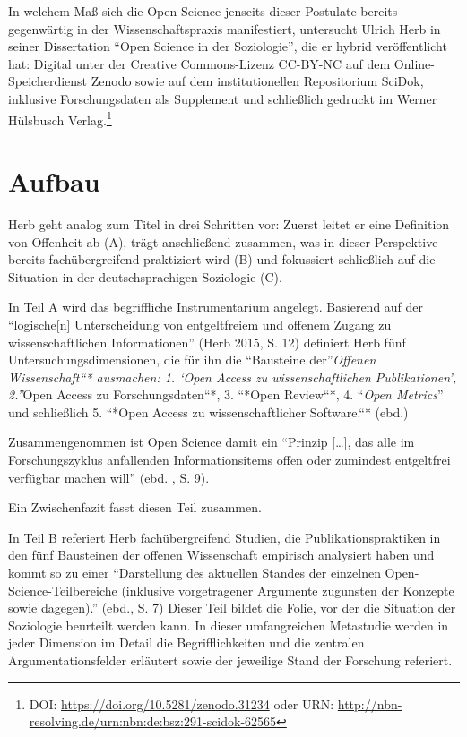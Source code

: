 \documentclass[a4paper,
fontsize=11pt,
oneside,
numbers=noperiodatend,
parskip=half-,
bibliography=totoc,
final
]{scrartcl}
\begin{document}
In welchem Maß sich die Open Science jenseits dieser Postulate bereits
gegenwärtig in der Wissenschaftspraxis manifestiert, untersucht Ulrich
Herb in seiner Dissertation \enquote{Open Science in der Soziologie},
die er hybrid veröffentlicht hat: Digital unter der Creative
Commons-Lizenz CC-BY-NC auf dem Online-Speicherdienst Zenodo sowie auf
dem institutionellen Repositorium SciDok, inklusive Forschungsdaten als
Supplement und schließlich gedruckt im Werner Hülsbusch
Verlag.\footnote{DOI: \url{https://doi.org/10.5281/zenodo.31234} oder
  URN: \url{http://nbn-resolving.de/urn:nbn:de:bsz:291-scidok-62565}}

\section*{Aufbau}\label{aufbau}

Herb geht analog zum Titel in drei Schritten vor: Zuerst leitet er eine
Definition von Offenheit ab (A), trägt anschließend zusammen, was in
dieser Perspektive bereits fachübergreifend praktiziert wird (B) und
fokussiert schließlich auf die Situation in der deutschsprachigen
Soziologie (C).

In Teil A wird das begriffliche Instrumentarium angelegt. Basierend auf
der \enquote{logische{[}n{]} Unterscheidung von entgeltfreiem und
offenem Zugang zu wissenschaftlichen Informationen} (Herb 2015, S. 12)
definiert Herb fünf Untersuchungsdimensionen, die für ihn die
\enquote{Bausteine der}\emph{Offenen Wissenschaft\enquote{* ausmachen:
1. \emph{\enquote{Open Access zu wissenschaftlichen Publikationen},}
2.}}Open Access zu Forschungsdaten``*, 3. ``*Open Review``*, 4.
\enquote{\emph{Open Metrics}} und schließlich 5. ``*Open Access zu
wissenschaftlicher Software.``* (ebd.)

Zusammengenommen ist Open Science damit ein \enquote{Prinzip
{[}\ldots{}{]}, das alle im Forschungszyklus anfallenden
Informationsitems offen oder zumindest entgeltfrei verfügbar machen
will} (ebd. , S. 9).

Ein Zwischenfazit fasst diesen Teil zusammen.

In Teil B referiert Herb fachübergreifend Studien, die
Publikationspraktiken in den fünf Bausteinen der offenen Wissenschaft
empirisch analysiert haben und kommt so zu einer \enquote{Darstellung
des aktuellen Standes der einzelnen Open-Science-Teilbereiche (inklusive
vorgetragener Argumente zugunsten der Konzepte sowie dagegen).} (ebd.,
S. 7) Dieser Teil bildet die Folie, vor der die Situation der Soziologie
beurteilt werden kann. In dieser umfangreichen Metastudie werden in
jeder Dimension im Detail die Begrifflichkeiten und die zentralen
Argumentationsfelder erläutert sowie der jeweilige Stand der Forschung
referiert.
\end{document}
